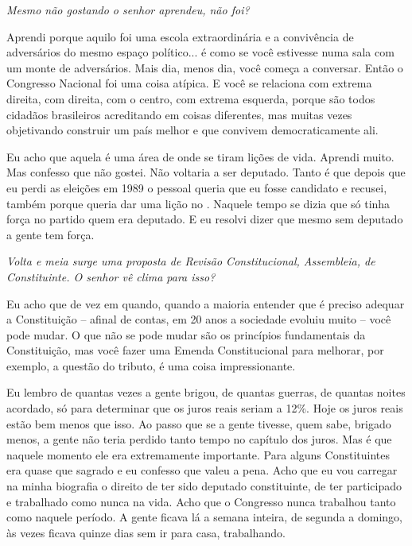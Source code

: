\medskip

\noindent\emph{Mesmo não gostando o senhor aprendeu, não foi?}

Aprendi porque aquilo foi uma escola extraordinária e a
convivência de adversários do mesmo espaço político... é como se você
estivesse numa sala com um monte de adversários. Mais dia, menos dia,
você começa a conversar. Então o Congresso Nacional foi uma coisa
atípica. E você se relaciona com extrema direita, com direita, com o
centro, com extrema esquerda, porque são todos cidadãos brasileiros
acreditando em coisas diferentes, mas muitas vezes objetivando construir
um país melhor e que convivem democraticamente ali.

Eu acho que aquela é uma área de onde se tiram lições de vida. Aprendi
muito. Mas confesso que não gostei. Não voltaria a ser deputado. Tanto é
que depois que eu perdi as eleições em 1989 o pessoal queria que eu
fosse candidato e recusei, também porque queria dar uma lição no .
Naquele tempo se dizia que só tinha força no partido quem era deputado.
E eu resolvi dizer que mesmo sem deputado a gente tem força.

\medskip

\noindent\emph{Volta e meia surge uma proposta de Revisão Constitucional,
Assembleia, de Constituinte. O senhor vê clima para isso?}

Eu acho que de vez em quando, quando a maioria entender
que é preciso adequar a Constituição -- afinal de contas, em 20 anos a
sociedade evoluiu muito -- você pode mudar. O que não se pode mudar são
os princípios fundamentais da Constituição, mas você fazer uma Emenda
Constitucional para melhorar, por exemplo, a questão do tributo, é uma
coisa impressionante.

Eu lembro de quantas vezes a gente brigou, de quantas guerras, de
quantas noites acordado, só para determinar que os juros reais seriam a
12\%. Hoje os juros reais estão bem menos que isso. Ao passo que se a
gente tivesse, quem sabe, brigado menos, a gente não teria perdido tanto
tempo no capítulo dos juros. Mas é que naquele momento ele era
extremamente importante. Para alguns Constituintes era quase que sagrado
e eu confesso que valeu a pena. Acho que eu vou carregar na minha
biografia o direito de ter sido deputado constituinte, de ter
participado e trabalhado como nunca na vida. Acho que o Congresso nunca
trabalhou tanto como naquele período. A gente ficava lá a semana
inteira, de segunda a domingo, às vezes ficava quinze dias sem ir para
casa, trabalhando.

